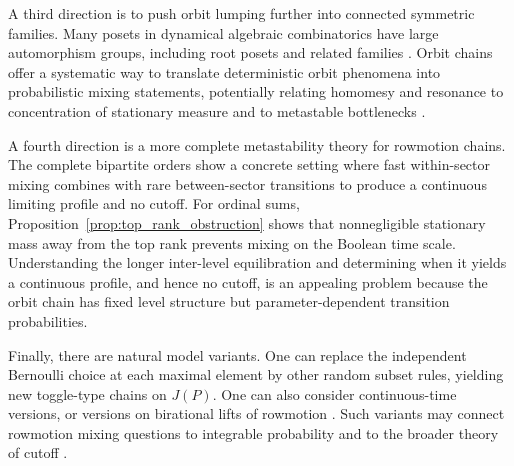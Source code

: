 \documentclass[final,3p,times]{elsarticle}
\theoremstyle{definition}
\begin{document}
A third direction is to push orbit lumping further into connected symmetric families.
Many posets in dynamical algebraic combinatorics have large automorphism groups, including root posets and related families \cite{Panyushev2009,ArmstrongStumpThomas2013}.
Orbit chains offer a systematic way to translate deterministic orbit phenomena into probabilistic mixing statements, potentially relating homomesy and resonance to concentration of stationary measure and to metastable bottlenecks \cite{ProppRoby2015Homomesy,DilksPechenikStriker2017Resonance}.

A fourth direction is a more complete metastability theory for rowmotion chains.
The complete bipartite orders show a concrete setting where fast within-sector mixing combines with rare between-sector transitions to produce a continuous limiting profile and no cutoff.
For ordinal sums, Proposition~\ref{prop:top_rank_obstruction} shows that nonnegligible stationary mass away from the top rank prevents mixing on the Boolean time scale.
Understanding the longer inter-level equilibration and determining when it yields a continuous profile, and hence no cutoff, is an appealing problem because the orbit chain has fixed level structure but parameter-dependent transition probabilities.

Finally, there are natural model variants.
One can replace the independent Bernoulli choice at each maximal element by other random subset rules, yielding new toggle-type chains on $J(P)$.
One can also consider continuous-time versions, or versions on birational lifts of rowmotion \cite{MusikerRoby2019BirationalPaths}.
Such variants may connect rowmotion mixing questions to integrable probability and to the broader theory of cutoff \cite{Diaconis1996Cutoff}.



\end{document}
